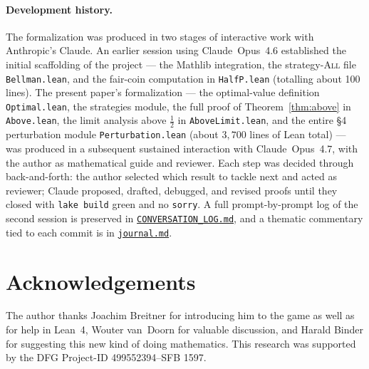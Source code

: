 \documentclass[12pt]{article}
\theoremstyle{definition}
\theoremstyle{remark}
\newcommand{\All}{\textsc{All}}
\begin{document}
\paragraph{Development history.}
The formalization was produced in two stages of interactive work
with Anthropic's Claude.  An earlier session using Claude~Opus~4.6
established the initial scaffolding of the project --- the
Mathlib integration, the strategy-\All{} file
\texttt{Bellman.lean}, and the fair-coin computation in
\texttt{HalfP.lean} (totalling about 100 lines).  The present
paper's formalization --- the optimal-value definition
\texttt{Optimal.lean}, the strategies module, the full proof of
Theorem~\ref{thm:above} in \texttt{Above.lean}, the limit
analysis above $\tfrac12$ in \texttt{AboveLimit.lean}, and the
entire \S4 perturbation module \texttt{Perturbation.lean} (about
$3{,}700$ lines of Lean total) --- was produced in a subsequent
sustained interaction with Claude~Opus~4.7, with the author as
mathematical guide and reviewer.  Each step was decided through
back-and-forth: the author selected which result to tackle next
and acted as reviewer; Claude proposed, drafted, debugged, and
revised proofs until they closed with \texttt{lake build} green and
no \texttt{sorry}.  A full prompt-by-prompt log of the second
session is preserved in
\href{https://github.com/pfaffelh/coins/blob/main/CONVERSATION_LOG.md}{\texttt{CONVERSATION\_LOG.md}},
and a thematic commentary tied to each commit is in
\href{https://github.com/pfaffelh/coins/blob/main/journal.md}{\texttt{journal.md}}.

\section*{Acknowledgements}

The author thanks Joachim Breitner for introducing him to the
game as well as for help in Lean~4, Wouter van~Doorn for valuable discussion, 
and Harald Binder for suggesting this new kind of doing mathematics.
This research was supported by the DFG Project-ID 499552394–SFB 1597.
\end{document}
